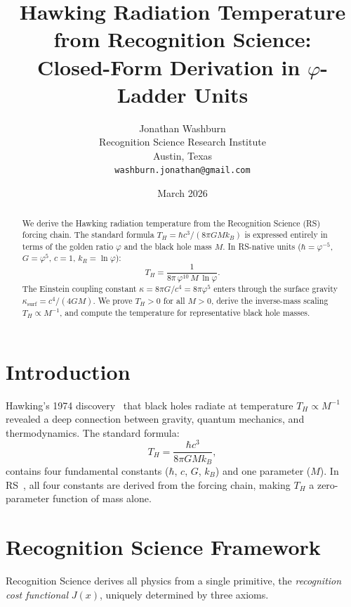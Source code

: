 \documentclass[12pt,a4paper]{article}
\title{Hawking Radiation Temperature from Recognition Science:\\
Closed-Form Derivation in $\varphi$-Ladder Units}
\author{Jonathan Washburn\\
Recognition Science Research Institute\\
Austin, Texas\\
\texttt{washburn.jonathan@gmail.com}}
\date{March 2026}
\theoremstyle{definition}
\theoremstyle{remark}
\begin{document}
\maketitle

\begin{abstract}
We derive the Hawking radiation temperature from the Recognition
Science (RS) forcing chain.  The standard formula $T_H = \hbar c^3/
(8\pi G M k_B)$ is expressed entirely in terms of the golden ratio
$\varphi$ and the black hole mass $M$.  In RS-native units
($\hbar = \varphi^{-5}$, $G = \varphi^5$, $c = 1$,
$k_R = \ln\varphi$):
\begin{equation*}
  T_H = \frac{1}{8\pi\,\varphi^{10}\,M\,\ln\varphi}.
\end{equation*}
The Einstein coupling constant $\kappa = 8\pi G/c^4 = 8\pi\varphi^5$
enters through the surface gravity $\kappa_{\mathrm{surf}} =
c^4/(4GM)$.  We prove $T_H > 0$ for all $M > 0$, derive the
inverse-mass scaling $T_H \propto M^{-1}$, and compute the
temperature for representative black hole masses.
\end{abstract}

\section{Introduction}

Hawking's 1974 discovery~\cite{Hawking1974} that black holes radiate
at temperature $T_H \propto M^{-1}$ revealed a deep connection between
gravity, quantum mechanics, and thermodynamics.  The standard formula:
\begin{equation}
  T_H = \frac{\hbar c^3}{8\pi G M k_B},
  \label{eq:TH-SI}
\end{equation}
contains four fundamental constants ($\hbar$, $c$, $G$, $k_B$) and
one parameter ($M$).  In RS~\cite{RS_Axioms}, all four constants are
derived from the forcing chain, making $T_H$ a zero-parameter function
of mass alone.

\section{Recognition Science Framework}
\label{sec:framework}

Recognition Science derives all physics from a single primitive,
the \emph{recognition cost functional} $J(x)$, uniquely determined
by three axioms.
\end{document}
